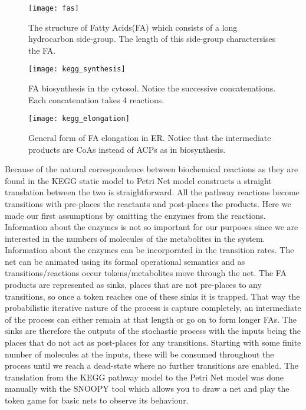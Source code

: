 \begin{figure}[htbp!]
\centering
\texttt{[image: fas]}
\caption[FA structure]{The structure of Fatty Acids(FA) which
  consists of a long hydrocarbon side-group. The length of this
  side-group charactersises the FA.}
\label{fig:fas}
\end{figure}

\begin{figure}[htbp!]
\centering
\texttt{[image: kegg\_synthesis]}
\caption[Fatty Acid biosynthsis in cytosol]{FA biosynthesis in the
  cytosol. Notice the successive concatenations. Each concatenation
  takes 4 reactions.}
\label{fig:kegg_synthesis}
\end{figure}

\begin{figure}[htbp!]
\centering
\texttt{[image: kegg\_elongation]}
\caption[Fatty Acid elongation in ER]{General form of FA elongation in
ER. Notice that the intermediate products are CoAs instead of ACPs as
in biosynthesis.}
\label{fig:kegg_elongation}
\end{figure}

Because of the natural correspondence between biochemical reactions as
they are found in the KEGG static model to Petri Net model constructs
a straight translation between the two is straightforward. All the
pathway reactions become transitions with pre-places the reactants and
post-places the products. Here we made our first assumptions by
omitting the enzymes from the reactions. Information about the enzymes
is not so important for our purposes since we are interested in the
numbers of molecules of the metabolites in the system. Information
about the enzymes can be incorporated in the transition rates. 
The net can be animated using its formal
operational semantics and as transitions/reactions occur
tokens/metabolites move through the net. The FA products are
represented as sinks, places that are not pre-places to any
transitions, so once a token reaches one of these sinks it is
trapped. That way the probabilistic iterative nature of the process is
capture completely, an intermediate of the process can either remain
at that length or go on to form longer FAs. The sinks are therefore
the outputs of the stochastic process with the inputs being the places
that do not act as post-places for any transitions. Starting with some
finite number of molecules at the inputs, these will be consumed
throughout the process until we reach a dead-state where no further
transitions are enabled. The translation from the KEGG pathway model
to the Petri Net model was done manually with the SNOOPY \cite []
{heiner2012snoopy}tool which
allows you to draw a net and play the token game for basic nets to
observe its behaviour. 

